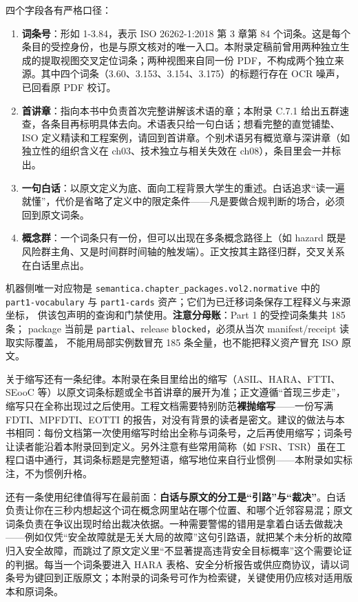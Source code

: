 四个字段各有严格口径：

\begin{enumerate}
\item \textbf{词条号}：形如 1-3.84，表示 ISO 26262-1:2018 第 3 章第 84 个词条。这是每个条目的受控身份，也是与原文核对的唯一入口。本附录定稿前曾用两种独立生成的提取视图交叉定位词条；两种视图来自同一份 PDF，不构成两个独立来源。其中四个词条（3.60、3.153、3.154、3.175）的标题行存在 OCR 噪声，已回看原 PDF 校订。
\item \textbf{首讲章}：指向本书中负责首次完整讲解该术语的章；本附录 C.7.1 给出五群速查，各条目再标明具体去向。术语表只给一句白话；想看完整的直觉铺垫、ISO 定义精读和工程案例，请回到首讲章。个别术语另有概览章与深讲章（如独立性的组织含义在 ch03、技术独立与相关失效在 ch08），条目里会一并标出。
\item \textbf{一句白话}：以原文定义为底、面向工程背景大学生的重述。白话追求“读一遍就懂”，代价是省略了定义中的限定条件——凡是要做合规判断的场合，必须回到原文词条。
\item \textbf{概念群}：一个词条只有一份，但可以出现在多条概念路径上（如 hazard 既是风险群主角、又是时间群时间轴的触发端）。正文按其主路径归群，交叉关系在白话里点出。
\end{enumerate}

机器侧唯一对应物是 \nolinkurl{semantica.chapter_packages.vol2.normative} 中的
\nolinkurl{part1-vocabulary} 与 \nolinkurl{part1-cards} 资产；它们为已迁移词条保存工程释义与来源坐标，
供该包声明的查询和门禁使用。\textbf{注意分母账}：Part 1 的受控词条集共 185 条；
package 当前是 \nolinkurl{partial}、release \nolinkurl{blocked}，必须从当次 manifest/receipt 读取实际覆盖，
不能用局部实例数冒充 185 条全量，也不能把释义资产冒充 ISO 原文。

关于缩写还有一条纪律。本附录在条目里给出的缩写（ASIL、HARA、FTTI、SEooC 等）以原文词条标题或全书首讲章的展开为准；正文遵循“首现三步走”，缩写只在全称出现过之后使用。工程文档需要特别防范\textbf{裸抛缩写}——一份写满 FDTI、MPFDTI、EOTTI 的报告，对没有背景的读者是密文。建议的做法与本书相同：每份文档第一次使用缩写时给出全称与词条号，之后再使用缩写；词条号让读者能沿着本附录回到定义。另外注意有些常用简称（如 FSR、TSR）虽在工程口语中通行，其词条标题是完整短语，缩写地位来自行业惯例——本附录如实标注，不为惯例升格。

还有一条使用纪律值得写在最前面：\textbf{白话与原文的分工是“引路”与“裁决”}。白话负责让你在三秒内想起这个词在概念网里站在哪个位置、和哪个近邻容易混；原文词条负责在争议出现时给出裁决依据。一种需要警惕的错用是拿着白话去做裁决——例如仅凭“安全故障就是无关大局的故障”这句引路语，就把某个未分析的故障归入安全故障，而跳过了原文定义里“不显著提高违背安全目标概率”这个需要论证的判据。每当一个词条要进入 HARA 表格、安全分析报告或供应商协议，请以词条号为键回到正版原文；本附录的词条号可作为检索键，关键使用仍应核对适用版本和原词条。


